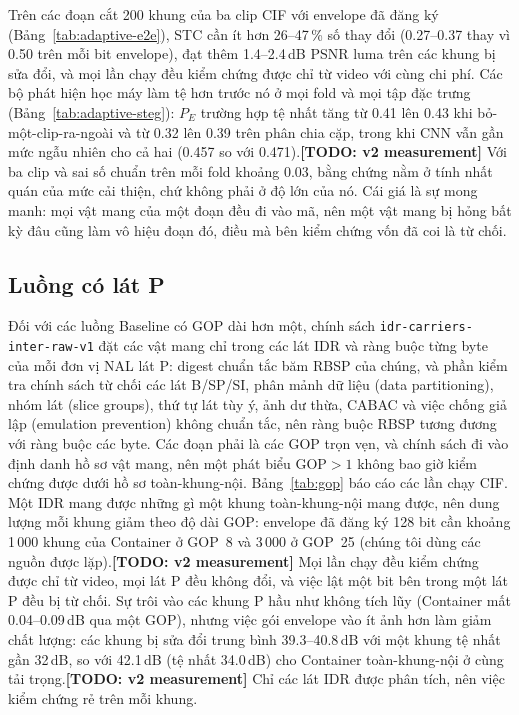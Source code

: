 \documentclass[journal]{IEEEtran}
\newcommand{\todo}[1]{\textbf{[TODO: #1]}}
\begin{document}
Trên các đoạn cắt 200 khung của ba clip CIF với envelope đã đăng ký
(Bảng~\ref{tab:adaptive-e2e}), STC cần ít hơn 26--47\,\% số thay đổi
(0.27--0.37 thay vì 0.50 trên mỗi bit envelope), đạt thêm 1.4--2.4\,dB PSNR
luma trên các khung bị sửa đổi, và mọi lần chạy đều kiểm chứng được chỉ từ
video với cùng chi phí. Các bộ phát hiện học máy làm tệ hơn trước nó ở mọi fold
và mọi tập đặc trưng (Bảng~\ref{tab:adaptive-steg}): $P_E$ trường hợp tệ nhất
tăng từ 0.41 lên 0.43 khi bỏ-một-clip-ra-ngoài và từ 0.32 lên 0.39 trên phân
chia cặp, trong khi CNN vẫn gần mức ngẫu nhiên cho cả hai (0.457 so với
0.471).\todo{v2 measurement} Với ba clip và sai số chuẩn trên mỗi fold khoảng 0.03, bằng chứng nằm
ở tính nhất quán của mức cải thiện, chứ không phải ở độ lớn của nó. Cái giá là
sự mong manh: mọi vật mang của một đoạn đều đi vào mã, nên một vật mang bị hỏng
bất kỳ đâu cũng làm vô hiệu đoạn đó, điều mà bên kiểm chứng vốn đã coi là từ
chối.




\subsection{Luồng có lát P}
\label{sec:gop}
Đối với các luồng Baseline có GOP dài hơn một, chính sách
\texttt{idr-carriers-inter-raw-v1} đặt các vật mang chỉ trong các lát IDR và
ràng buộc từng byte của mỗi đơn vị NAL lát P: digest chuẩn tắc băm RBSP của
chúng, và phần kiểm tra chính sách từ chối các lát B/SP/SI, phân mảnh dữ liệu
(data partitioning), nhóm lát (slice groups), thứ tự lát tùy ý, ảnh dư thừa,
CABAC và việc chống giả lập (emulation prevention) không chuẩn tắc, nên ràng
buộc RBSP tương đương với ràng buộc các byte. Các đoạn phải là các GOP trọn vẹn,
và chính sách đi vào định danh hồ sơ vật mang, nên một phát biểu GOP$>1$ không
bao giờ kiểm chứng được dưới hồ sơ toàn-khung-nội. Bảng~\ref{tab:gop} báo cáo
các lần chạy CIF. Một IDR mang được những gì một khung toàn-khung-nội mang được,
nên dung lượng mỗi khung giảm theo độ dài GOP: envelope đã đăng ký 128 bit cần
khoảng 1\,000 khung của Container ở GOP~8 và 3\,000 ở GOP~25 (chúng tôi dùng các
nguồn được lặp).\todo{v2 measurement} Mọi lần chạy đều kiểm chứng được chỉ từ video, mọi lát P đều
không đổi, và việc lật một bit bên trong một lát P đều bị từ chối. Sự trôi vào
các khung P hầu như không tích lũy (Container mất 0.04--0.09\,dB qua một GOP),
nhưng việc gói envelope vào ít ảnh hơn làm giảm chất lượng: các khung bị sửa đổi
trung bình 39.3--40.8\,dB với một khung tệ nhất gần 32\,dB, so với 42.1\,dB (tệ
nhất 34.0\,dB) cho Container toàn-khung-nội ở cùng tải trọng.\todo{v2 measurement} Chỉ các lát IDR
được phân tích, nên việc kiểm chứng rẻ trên mỗi khung.
\end{document}
